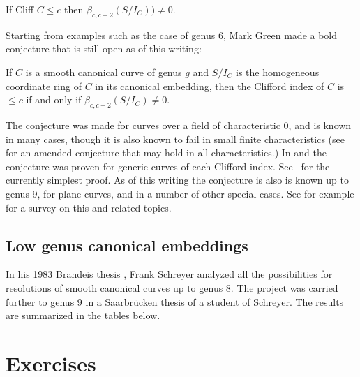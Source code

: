 \begin{corollary}
 If Cliff $C \leq c$ then $\beta_{c,c-2}(S/I_C)) \neq 0.$
\end{corollary}
 

Starting from examples such as the case of genus 6, Mark Green made a bold conjecture that is still open as of this writing:

\begin{conjecture}
If $C$ is a smooth canonical curve of genus $g$ and $S/I_C$ is the homogeneous coordinate ring of $C$ in its canonical embedding,
then the Clifford index of $C$ is $\leq c$ if and only if $\beta_{c,c-2}(S/I_C) \neq 0$. 
\end{conjecture}

The conjecture was made for curves over a field of characteristic 0, and is known in many cases, though it is also known to fail in small finite characteristics (see~\cite{Bopp-Schreyer} for an amended conjecture that may hold in all characteristics.)
In \cite{MR1941089} and \cite{MR2157134} the conjecture was proven for generic curves of each Clifford index.  See~\cite{MR4022070} for the currently simplest
proof. As of this writing the conjecture is also is known up to genus 9,  for plane curves, and in a number of other special cases.
See for example \cite{Farkas-progress-on-syzygies} for a survey on this and related topics.

\subsection{Low genus canonical embeddings} 
In his 1983 Brandeis thesis \cite{Schreyer-canonical}, Frank Schreyer analyzed all the possibilities for resolutions of smooth canonical curves up to genus 8. The project was carried further to genus 9 in a Saarbr\"ucken thesis \cite{Sagraloff}  of a student of Schreyer. The results are summarized in the tables below.

%
%

\section{Exercises}

